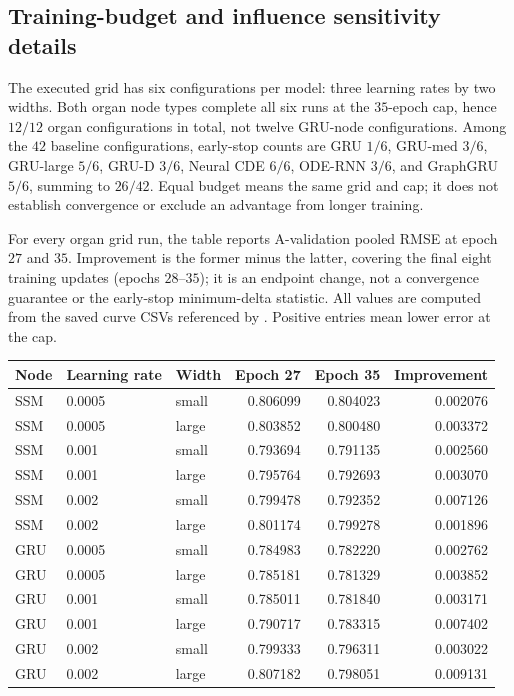\subsection{Training-budget and influence sensitivity details}\label{app:budgetcurves}
The executed grid has six configurations per model: three learning rates by two widths. Both organ node types complete all six runs at the $35$-epoch cap, hence $12/12$ organ configurations in total, not twelve GRU-node configurations. Among the $42$ baseline configurations, early-stop counts are GRU $1/6$, GRU-med $3/6$, GRU-large $5/6$, GRU-D $3/6$, Neural CDE $6/6$, ODE-RNN $3/6$, and GraphGRU $5/6$, summing to $26/42$. Equal budget means the same grid and cap; it does not establish convergence or exclude an advantage from longer training.

For every organ grid run, the table reports A-validation pooled RMSE at epoch $27$ and $35$. Improvement is the former minus the latter, covering the final eight training updates (epochs $28$--$35$); it is an endpoint change, not a convergence guarantee or the early-stop minimum-delta statistic. All values are computed from the saved curve CSVs referenced by . Positive entries mean lower error at the cap.

\begin{center}\small
\begin{tabular}{lllrrr}
\toprule
Node & Learning rate & Width & Epoch 27 & Epoch 35 & Improvement\\
\midrule
SSM & 0.0005 & small & 0.806099 & 0.804023 & 0.002076 \\
SSM & 0.0005 & large & 0.803852 & 0.800480 & 0.003372 \\
SSM & 0.001 & small & 0.793694 & 0.791135 & 0.002560 \\
SSM & 0.001 & large & 0.795764 & 0.792693 & 0.003070 \\
SSM & 0.002 & small & 0.799478 & 0.792352 & 0.007126 \\
SSM & 0.002 & large & 0.801174 & 0.799278 & 0.001896 \\
GRU & 0.0005 & small & 0.784983 & 0.782220 & 0.002762 \\
GRU & 0.0005 & large & 0.785181 & 0.781329 & 0.003852 \\
GRU & 0.001 & small & 0.785011 & 0.781840 & 0.003171 \\
GRU & 0.001 & large & 0.790717 & 0.783315 & 0.007402 \\
GRU & 0.002 & small & 0.799333 & 0.796311 & 0.003022 \\
GRU & 0.002 & large & 0.807182 & 0.798051 & 0.009131 \\
\bottomrule
\end{tabular}
\end{center}

